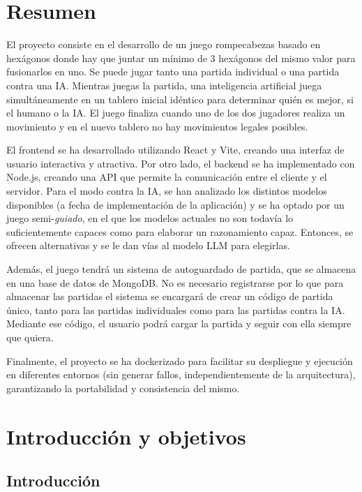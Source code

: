 \documentclass[12pt,epsf,titlepage,a4paper]{article}
\begin{document}
\pagebreak

\section{Resumen}

El proyecto consiste en el desarrollo de un juego rompecabezas basado en hexágonos donde hay que juntar un mínimo de 3 hexágonos del mismo valor para fusionarlos en uno. Se puede jugar tanto una partida individual o una partida contra una IA. Mientras juegas la partida, una inteligencia artificial juega simultáneamente en un tablero inicial idéntico para determinar quién es mejor, si el humano o la IA. El juego finaliza cuando uno de los dos jugadores realiza un movimiento y en el nuevo tablero no hay movimientos legales posibles.

El frontend se ha desarrollado utilizando React y Vite, creando una interfaz de usuario interactiva y atractiva. Por otro lado, el backend se ha implementado con Node.js, creando una API que permite la comunicación entre el cliente y el servidor. Para el modo contra la IA, se han analizado los distintos modelos disponibles (a fecha de implementación de la aplicación) y se ha optado por un juego semi-\emph{guiado}, en el que los modelos actuales no son todavía lo suficientemente capaces como para elaborar un razonamiento capaz. Entonces, se ofrecen alternativas y se le dan vías al modelo LLM para elegirlas.

Además, el juego tendrá un sistema de autoguardado de partida, que se almacena en una base de datos de MongoDB. No es necesario registrarse por lo que para almacenar las partidas el sistema se encargará de crear un código de partida único, tanto para las partidas individuales como para las partidas contra la IA. Mediante ese código, el usuario podrá cargar la partida y seguir con ella siempre que quiera.

Finalmente, el proyecto se ha dockerizado para facilitar su despliegue y ejecución en diferentes entornos (sin generar fallos, independientemente de la arquitectura), garantizando la portabilidad y consistencia del mismo.

\pagebreak
\section{Introducción y objetivos}
\subsection{Introducción}
\end{document}
